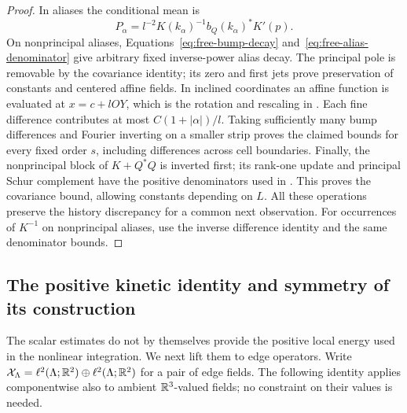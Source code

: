 \begin{proof}
In aliases the conditional mean is
\[
 P_\alpha=l^{-2}K(k_\alpha)^{-1}b_Q(k_\alpha)^*K'(p).
\]
On nonprincipal aliases, Equations~\eqref{eq:free-bump-decay}
and~\eqref{eq:free-alias-denominator} give arbitrary fixed inverse-power
alias decay.  The principal pole is removable by the covariance
identity; its zero and first jets prove preservation of constants and
centered affine fields.  In inclined coordinates an affine function
is evaluated at $x=c+lOY$, which is the rotation and rescaling in
.  Each fine difference
contributes at most $C(1+|\alpha|)/l$.  Taking sufficiently many bump
differences and Fourier inverting on a smaller strip proves the
claimed bounds for every fixed order $s$, including differences
across cell boundaries.  Finally, the nonprincipal block of
$K+Q^*Q$ is inverted first; its rank-one update and principal Schur
complement have the positive denominators used in .
This proves the covariance bound, allowing constants depending on $L$.
All these operations preserve the history discrepancy for a common
next observation.  For occurrences of $K^{-1}$ on nonprincipal aliases,
use the inverse difference identity and the same denominator bounds.
\end{proof}

\subsection{The positive kinetic identity and symmetry of its construction}

The scalar estimates do not by themselves provide the positive local
energy used in the nonlinear integration.  We next lift them to edge
operators.  Write
$\mathcal X_\Lambda=\ell^2(\Lambda;\mathbb R^2)\oplus
\ell^2(\Lambda;\mathbb R^2)$ for a pair of edge fields.
The following identity applies componentwise also to ambient
$\mathbb R^3$-valued fields; no constraint on their values is needed.

